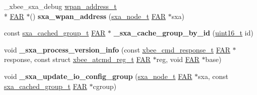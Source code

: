 \begin{DoxyCompactItemize}
\item 
\hypertarget{group___s_x_a_gac3fa6c3eac7807ed51bdbee114e9e4dc}{\-\_\-xbee\-\_\-sxa\-\_\-debug \hyperlink{structwpan__address__t}{wpan\-\_\-address\-\_\-t} \\*
\hyperlink{group__hal_gaef060b3456fdcc093a7210a762d5f2ed}{F\-A\-R} $\ast$() {\bfseries sxa\-\_\-wpan\-\_\-address} (\hyperlink{structsxa__node__t}{sxa\-\_\-node\-\_\-t} \hyperlink{group__hal_gaef060b3456fdcc093a7210a762d5f2ed}{F\-A\-R} $\ast$sxa)}\label{group___s_x_a_gac3fa6c3eac7807ed51bdbee114e9e4dc}

\item 
\hypertarget{group___s_x_a_gaf299bcddfe8f4dfb4a3f0617a16d671e}{const \hyperlink{structsxa__cached__group__t}{sxa\-\_\-cached\-\_\-group\-\_\-t} \hyperlink{group__hal_gaef060b3456fdcc093a7210a762d5f2ed}{F\-A\-R} $\ast$ {\bfseries \-\_\-sxa\-\_\-cache\-\_\-group\-\_\-by\-\_\-id} (\hyperlink{group__hal_ga5a8b2dc9e45a9ee81a94ef304fb62505}{uint16\-\_\-t} id)}\label{group___s_x_a_gaf299bcddfe8f4dfb4a3f0617a16d671e}

\item 
\hypertarget{group___s_x_a_gaac6448275c5e6b10263ae7c73afce3c3}{void {\bfseries \-\_\-sxa\-\_\-process\-\_\-version\-\_\-info} (const \hyperlink{structxbee__cmd__response__t}{xbee\-\_\-cmd\-\_\-response\-\_\-t} \hyperlink{group__hal_gaef060b3456fdcc093a7210a762d5f2ed}{F\-A\-R} $\ast$response, const struct \hyperlink{structxbee__atcmd__reg__t}{xbee\-\_\-atcmd\-\_\-reg\-\_\-t} \hyperlink{group__hal_gaef060b3456fdcc093a7210a762d5f2ed}{F\-A\-R} $\ast$reg, void \hyperlink{group__hal_gaef060b3456fdcc093a7210a762d5f2ed}{F\-A\-R} $\ast$base)}\label{group___s_x_a_gaac6448275c5e6b10263ae7c73afce3c3}

\item 
\hypertarget{group___s_x_a_ga52a1b2b68e747e9f286974c473cb8a9b}{void {\bfseries \-\_\-sxa\-\_\-update\-\_\-io\-\_\-config\-\_\-group} (\hyperlink{structsxa__node__t}{sxa\-\_\-node\-\_\-t} \hyperlink{group__hal_gaef060b3456fdcc093a7210a762d5f2ed}{F\-A\-R} $\ast$sxa, const \hyperlink{structsxa__cached__group__t}{sxa\-\_\-cached\-\_\-group\-\_\-t} \hyperlink{group__hal_gaef060b3456fdcc093a7210a762d5f2ed}{F\-A\-R} $\ast$cgroup)}\label{group___s_x_a_ga52a1b2b68e747e9f286974c473cb8a9b}


\end{DoxyCompactItemize}
